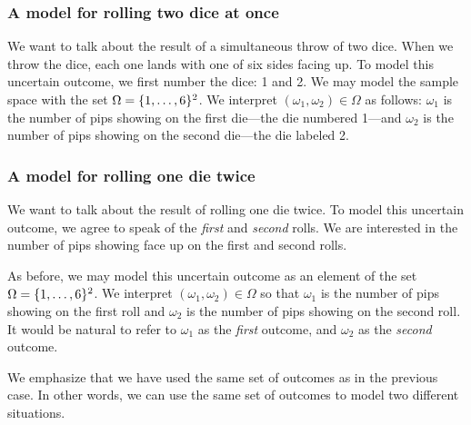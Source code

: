 \subsubsection*{A model for rolling two dice at once}



We want to talk about the result of a simultaneous throw of two dice.
When we throw the dice, each one lands with one of six sides facing up.
To model this uncertain outcome, we first number the dice: 1 and 2.
We may model the sample space with the set $\Omega  = \{1, \dots , 6\}^2$.
We interpret $(\omega _1, \omega _2) \in \Omega $ as follows: $\omega _1$ is the number of pips showing on the first die---the die numbered 1---and $\omega _2$ is the number of pips showing on the second die---the die labeled 2.

\subsubsection*{A model for rolling one die twice}



We want to talk about the result of rolling one die twice.
To model this uncertain outcome, we agree to speak of the \textit{first} and \textit{second} rolls.
We are interested in the number of pips showing face up on the first and second rolls.

As before, we may model this uncertain outcome as an element of the set $\Omega  = \{1, \dots , 6\}^2$.
We interpret $(\omega _1, \omega _2) \in \Omega $ so that $\omega _1$ is the number of pips showing on the first roll and $\omega _2$ is the number of pips showing on the second roll.
It would be natural to refer to $\omega _1$ as the \textit{first} outcome, and $\omega _2$ as the \textit{second} outcome.

We emphasize that we have used the same set of outcomes as in the previous case.
In other words, we can use the same set of outcomes to model two different situations.
%  

